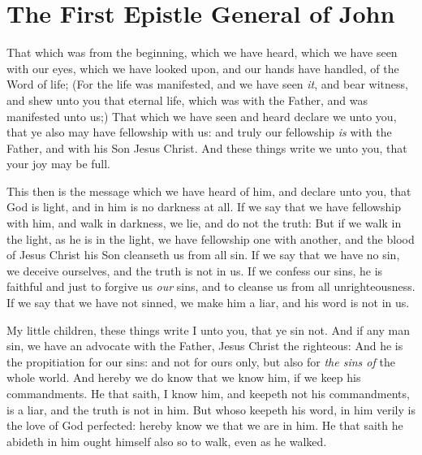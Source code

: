\documentclass[11pt,letterpaper,oneside]{memoir}
\begin{document}
\chapter[1 John]{The First Epistle General of John}

That which was from the beginning, which we have heard, which we have
seen with our eyes, which we have looked upon, and our hands have
handled, of the Word of life;  (For the life was manifested, and we
have seen \emph{it}, and bear witness, and shew unto you that eternal
life, which was with the Father, and was manifested unto us;)  That
which we have seen and heard declare we unto you, that ye also may
have fellowship with us: and truly our fellowship \emph{is} with the
Father, and with his Son Jesus Christ.  And these things write we unto
you, that your joy may be full.

This then is the message which we have heard of him, and declare unto
you, that God is light, and in him is no darkness at all.  If we say
that we have fellowship with him, and walk in darkness, we lie, and do
not the truth:  But if we walk in the light, as he is in the light, we
have fellowship one with another, and the blood of Jesus Christ his
Son cleanseth us from all sin.  If we say that we have no sin, we
deceive ourselves, and the truth is not in us.  If we confess our
sins, he is faithful and just to forgive us \emph{our} sins, and to
cleanse us from all unrighteousness.  If we say that we have not
sinned, we make him a liar, and his word is not in us.

My little children, these things write I unto you, that ye sin not.
And if any man sin, we have an advocate with the Father, Jesus Christ
the righteous:  And he is the propitiation for our sins: and not for
ours only, but also for \emph{the sins of} the whole world.  And
hereby we do know that we know him, if we keep his commandments.  He
that saith, I know him, and keepeth not his commandments, is a liar,
and the truth is not in him.  But whoso keepeth his word, in him
verily is the love of God perfected: hereby know we that we are in
him.  He that saith he abideth in him ought himself also so to walk,
even as he walked.
\end{document}
